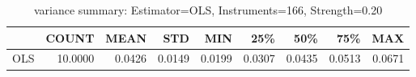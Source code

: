 \begin{table}[ht]
\centering
\caption{variance summary: Estimator=OLS, Instruments=166, Strength=0.20}
\begin{tabular}{lrrrrrrrr}
\toprule
 & COUNT & MEAN & STD & MIN & 25\% & 50\% & 75\% & MAX \\
\midrule
OLS & 10.0000 & 0.0426 & 0.0149 & 0.0199 & 0.0307 & 0.0435 & 0.0513 & 0.0671 \\
\bottomrule
\end{tabular}
\end{table}
